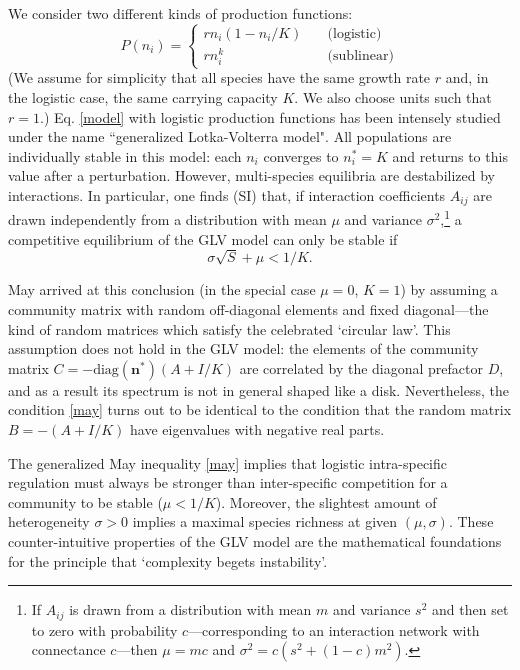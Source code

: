\documentclass[12pt]{article}
\begin{document}
We consider two different kinds of production functions:
\begin{equation}
    P(n_i) = \begin{cases}
        rn_i(1-n_i/K)\quad&\text{(logistic)}\\
        rn_i^k\quad&\text{(sublinear)}
     \end{cases}
\end{equation}
(We assume for simplicity that all species have the same growth rate $r$ and, in the logistic case, the same carrying capacity $K$. We also choose units such that $r=1$.) Eq. \eqref{model} with logistic production functions has been intensely studied under the name ``generalized Lotka-Volterra model". All populations are individually stable in this model: each $n_i$ converges to $n_i^* = K$ and returns to this value after a perturbation. However, multi-species equilibria are destabilized by interactions. In particular, one finds (SI) that, if interaction coefficients $A_{ij}$ are drawn independently from a distribution with mean $\mu$ and variance $\sigma^2$,\footnote{If $A_{ij}$ is drawn from a distribution with mean $m$ and variance $s^2$ and then set to zero with probability $c$---corresponding to an interaction network with connectance $c$---then $\mu = mc$ and $\sigma^2 = c(s^2 + (1-c)m^2)$.} a competitive equilibrium of the GLV model can only be stable if 
\begin{equation}\label{may}
    \sigma\sqrt{S} + \mu < 1/K.
\end{equation}

May arrived at this conclusion (in the special case $\mu = 0$, $K=1$) by assuming a  community matrix with random off-diagonal elements and fixed diagonal---the kind of random matrices which satisfy the celebrated `circular law'. This assumption does not hold in the GLV model: the elements of the community matrix $C = -\textrm{diag}(\mathbf{n}^*)(A + I/K)$ are correlated by the diagonal prefactor $D$, and as a result its spectrum is not in general shaped like a disk. Nevertheless, the condition \eqref{may} turns out to be identical to the condition that the random matrix $B=-(A + I/K)$ have eigenvalues with negative real parts. 

The generalized May inequality \eqref{may} implies that logistic intra-specific regulation must always be stronger than inter-specific competition for a community to be stable ($\mu < 1/K$). Moreover, the slightest amount of heterogeneity $\sigma>0$ implies a maximal species richness at given $(\mu, \sigma)$. These counter-intuitive properties of the GLV model are the mathematical foundations for the principle that `complexity begets instability'. 
\end{document}

